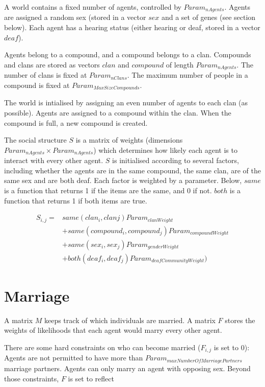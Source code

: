 \documentclass[11pt, oneside]{article}
\begin{document}
A world contains a fixed number of agents, controlled by $Param_{nAgents}$.  Agents are assigned a random sex (stored in a vector $sex$ and a set of genes (see section below).  Each agent has a hearing status (either hearing or deaf, stored in a vector $deaf$).

Agents belong to a compound, and a compound belongs to a clan.  Compounds and clans are stored as vectors $clan$ and $compound$ of length $Param_{nAgents}$.  The number of clans is fixed at $Param_{nClans}$.  The maximum number of people in a compound is fixed at $Param_{MaxSizeCompounds}$.

The world is intialised by assigning an even number of agents to each clan (as possible).  Agents are assigned to a compound within the clan.  When the compound is full, a new compound is created.

The social structure $S$ is a matrix of weights (dimensions $Param_{nAgents} \times Param_{nAgents}$) which determines how likely each agent is to interact with every other agent.  $S$ is initialised according to several factors, including whether the agents are in the same compound, the same clan, are of the same sex and are both deaf.  Each factor is weighted by a parameter.  Below, $same$ is a function that returns 1 if the items are the same, and 0 if not.  $both$ is a function that returns 1 if both items are true.

\begin{equation}
\begin{aligned}
S_{i,j} = & same(clan_{i}, clan{j})Param_{clanWeight}   \\
	& + same(compound_i,compound_j)Param_{compoundWeight}  \\
	& + same(sex_i,sex_j)Param_{genderWeight}  \\
	& + both(deaf_i,deaf_j)Param_{deafCommunityWeight})
\end{aligned}
\end{equation}


\section{Marriage}
A matrix $M$ keeps track of which individuals are married.  A matrix $F$ stores the weights of likelihoods that each agent would marry every other agent.

There are some hard constraints on who can become married ($F_{i,j}$ is set to 0):  Agents are not permitted to have more than $Param_{maxNumberOfMarriagePartners}$ marriage partners.  Agents can only marry an agent with opposing sex.  Beyond those constraints, $F$ is set to reflect
\end{document}
